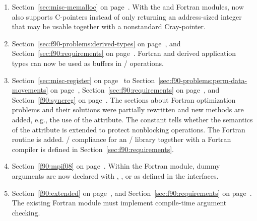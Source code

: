 \begin{enumerate}
\item 
Section~\ref{sec:misc-memalloc} on page~\pageref{sec:misc-memalloc}.
\newline 
With the  and  Fortran modules, 
 now also supports  C-pointers 
instead of only returning an address-sized integer that may be usable together 
with a nonstandard Cray-pointer.
 
\item 
Section~\ref{sec:f90-problems:derived-types} on page~\pageref{sec:f90-problems:derived-types}, and
Section~\ref{sec:f90:requirements} on page~\pageref{sec:f90:requirements}.
\newline 
Fortran  and  derived application types
can now be used as buffers in \MPI/ operations.
 
\item 
Section~\ref{sec:misc-register} on page~\pageref{sec:misc-register} to 
Section~\ref{sec:f90-problems:perm-data-movements} on page~\pageref{sec:f90-problems:perm-data-movements}, 
Section~\ref{sec:f90:requirements} on page~\pageref{sec:f90:requirements}, and
Section~\ref{f90:syncreg} on page~\pageref{f90:syncreg}.
\newline 
The sections about Fortran optimization problems and their solutions were
partially rewritten and new methods are added, e.g., the use of the  attribute.
The constant  tells whether
the semantics of the  attribute is extended to protect 
nonblocking operations.
The Fortran routine  is added. 
\MPIIIIDOTO/ compliance for an \MPI/ library together with a Fortran compiler is
defined in Section~\ref{sec:f90:requirements}. 
 
\item 
Section~\ref{f90:mpif08} on page~\pageref{f90:mpif08}.
\newline 
Within the  Fortran module,
dummy arguments are now declared with ,
, or  as defined in the  interfaces.
 
\item 
Section~\ref{f90:extended} on page~\pageref{f90:extended}, and
Section~\ref{sec:f90:requirements} on page~\pageref{sec:f90:requirements}.
\newline 
The existing  Fortran module must implement compile-time argument checking. 
 

\end{enumerate}
